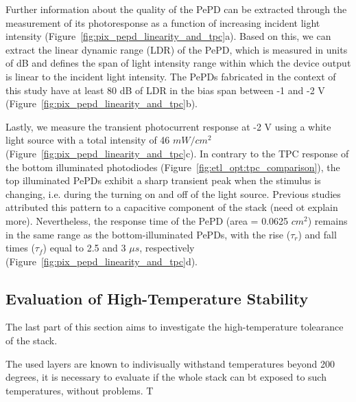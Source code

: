 Further information about the quality of the PePD can be extracted through the measurement of its photoresponse as a function of increasing incident light intensity (Figure~\ref{fig:pix_pepd_linearity_and_tpc}a). Based on this, we can extract the linear dynamic range (LDR) of the PePD, which is measured in units of dB and defines the span of light intensity range within which the device output is linear to the incident light intensity. The PePDs fabricated in the context of this study have at least 80 dB of LDR in the bias span between -1 and -2 V (Figure~\ref{fig:pix_pepd_linearity_and_tpc}b). 

Lastly, we measure the transient photocurrent response at -2 V using a white light source with a total intensity of 46 $mW/cm^2$ (Figure~\ref{fig:pix_pepd_linearity_and_tpc}c). In contrary to the TPC response of the bottom illuminated photodiodes (Figure~\ref{fig:etl_opt:tpc_comparison}), the top illuminated PePDs exhibit a sharp transient peak when the stimulus is changing, i.e. during the turning on and off of the light source. Previous studies attributed this pattern to a capacitive component of the stack \cite{Bisquert2023TransientPhotodetectors} (need ot explain more). Nevertheless, the response time of the PePD (area = 0.0625 $cm^2$) remains in the same range as the bottom-illuminated PePDs, with the rise ($\tau_r$) and fall times ($\tau_f$) equal to 2.5 and 3 $\mu s$, respectively (Figure~\ref{fig:pix_pepd_linearity_and_tpc}d). 


\subsection{Evaluation of High-Temperature Stability}

The last part of this section aims to investigate the high-temperature tolearance of the stack. 

The used layers are known to indivisually withstand temperatures beyond 200 degrees, it is necessary to evaluate if the whole stack can bt exposed to such temperatures, without problems. T


